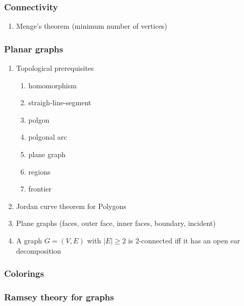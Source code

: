 \documentclass{article}
\begin{document}
\subsubsection*{Connectivity}
\begin{enumerate}
    \item Menge's theorem (minimum number of vertices)
\end{enumerate}
\subsubsection*{Planar graphs}
\begin{enumerate}
    \item Topological prerequisites
    \begin{enumerate}
        \item homomorphism
        \item straigh-line-segment
        \item polgon
        \item polgonal arc
        \item plane graph
        \item regions
        \item frontier
    \end{enumerate}
    \item Jordan curve theorem for Polygons
    \item Plane graphs (faces, outer face, inner faces, boundary, incident)
    \item A graph $G = (V,E)$ with $|E| \geq 2$ is 2-connected iff it has an open ear decomposition
\end{enumerate}
\subsubsection*{Colorings}
\subsubsection*{Ramsey theory for graphs}
\newpage
\end{document}
